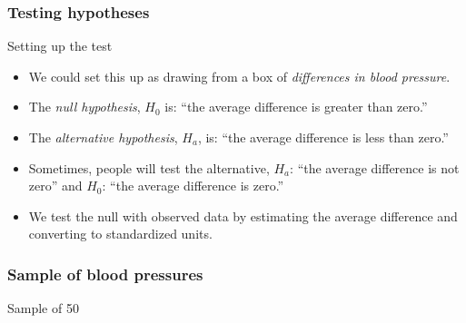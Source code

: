 \documentclass[handout]{beamer}
\begin{document}

   \begin{frame} \frametitle{Testing hypotheses}

   \begin{block}
   {Setting up the test}
   \begin{itemize}

   \item We could set this up as drawing from a box of {\em differences
   in blood pressure}.

   \item The {\em null hypothesis}, $H_0$ is: ``the average difference is greater than zero.''

   \item The {\em alternative hypothesis}, $H_a$, is: ``the average difference is less than zero.''

   \item Sometimes, people will test the alternative, $H_a$: ``the
   average difference is not zero'' and $H_0$: ``the average difference is zero.''

   \item We test the null with observed data by estimating
    the average difference and converting to standardized units.
   \end{itemize}
   \end{block}
   \end{frame}



   \begin{frame}
   \frametitle{Sample of blood pressures}
   \begin{center}
   \end{center}
   Sample of 50
   \end{frame}
\end{document}
